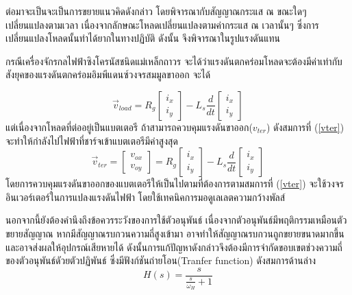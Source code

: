 \documentclass[11pt,a4paper]{article}
\begin{document}
ต่อมาจะเป็นจะเป็นการขยายแนวคิดดังกล่าว โดยพิจารณากับสัญญาณกระแส ณ ขณะใดๆ เปลี่ยนแปลงตามเวลา
เนื่องจากลักษณะโหลดเปลี่ยนแปลงตามค่ากระแส ณ เวลานั้นๆ ซึ่งการเปลี่ยนแปลงโหลดนั้นทำได้ยากในทางปฏิบัติ ดังนั้น
จึงพิจารณาในรูปแรงดันแทน

กรณีเครื่องจักรกลไฟฟ้าซิงโครนัสชนิดแม่เหล็กถาวร จะได้ว่าแรงดันตกคร่อมโหลดจะต้องมีค่าเท่ากับสังยุคของแรงดันตกคร่อมอิมพีแดนซ์วงจรสมมูลขาออก จะได้

\begin{equation}
    \vec{v}_{load}  = R_{g}
    \begin{bmatrix}
        i_{x} \\i_{y}
    \end{bmatrix} - L_{s}\frac{d}{dt}
    \begin{bmatrix}
        i_{x} \\i_{y}
    \end{bmatrix}
\end{equation}
แต่เนื่องจากโหลดที่ต่ออยู่เป็นแบตเตอรี ถ้าสามารถควบคุมแรงดันขาออก($v_{ter}$) ดังสมการที่ (\ref{vter}) จะทำให้กำลังไปไฟฟ้าที่ชาร์จเข้าแบตเตอรีมีค่าสูงสุด
\begin{equation}\label{vter}
    \vec{v}_{ter} =
    \begin{bmatrix}
        v_{ox} \\v_{oy}
    \end{bmatrix} = R_{g}
    \begin{bmatrix}
        i_{x} \\i_{y}
    \end{bmatrix} - L_{s}\frac{d}{dt}
    \begin{bmatrix}
        i_{x} \\i_{y}
    \end{bmatrix}
\end{equation}
โดยการควบคุมแรงดันขาออกของแบตเตอรีให้เป็นไปตามที่ต้องการตามสมการที่ (\ref{vter}) จะใช้วงจรอินเวอร์เตอร์ในการแปลงแรงดันไฟฟ้า โดยใช้เทคนิคการมอดูเลเลตความกว้างพัลส์

นอกจากนี้ยังต้องคำนึงถึงข้อควรระวังของการใช้ตัวอนุพันธ์ เนื่องจากตัวอนุพันธ์มีพฤติกรรมเหมือนตัวขยายสัญญาณ
หากมีสัญญาณรบกวนความถี่สูงเข้ามา อาจทำให้สัญญาณรบกวนถูกขยายขนาดมากขึ้น และอาจส่งผลให้อุปกรณ์เสียหายได้ ดังนั้นการแก้ปัญหาดังกล่าวจึงต้องมีการจำกัดขอบเขตช่วงความถี่
ของตัวอนุพันธ์ดัวยตัวปฏิพันธ์ ซึ่งมีฟังก์ชันถ่ายโอน(Tranfer function) ดังสมการด้านล่าง
\begin{equation}\label{bode1}
    H(s)  = \frac{ s }{ \frac{s}{\omega_{H}} + 1 }
\end{equation}
\end{document}
